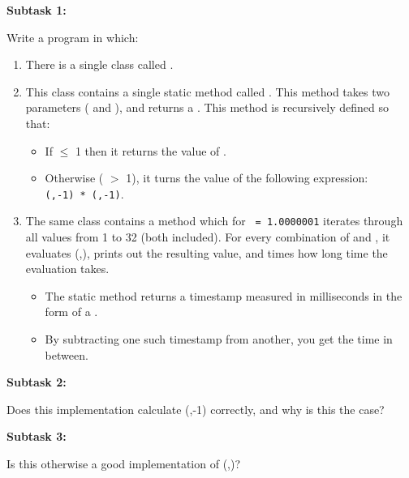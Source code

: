 \textbf{Subtask 1:}

Write a program in which:
\begin{enumerate}
  \item There is a single class called .
  \item This class contains a single static method called . This method takes two  parameters ( and ), and returns a . This method is recursively defined so that:
    \begin{itemize}
      \item If  $\leq$ 1 then it returns the value of .
      \item Otherwise ( $>$ 1), it turns the value of the following expression:
      \\
      \texttt{(,-1) * (,-1)}.
    \end{itemize}
  \item The same class contains a  method which for \texttt{ = 1.0000001} iterates through all  values from 1 to 32 (both included). For every combination of  and , it evaluates (,), prints out the resulting value, and times how long time the evaluation takes.
    \begin{itemize}
      \item The static method  returns a timestamp measured in milliseconds in the form of a .
      \item By subtracting one such timestamp from another, you get the time in between.
    \end{itemize}
\end{enumerate}

\textbf{Subtask 2:}

Does this implementation calculate (,-1) correctly, and why is this the case?

\textbf{Subtask 3:}

Is this otherwise a good implementation of (,)?
